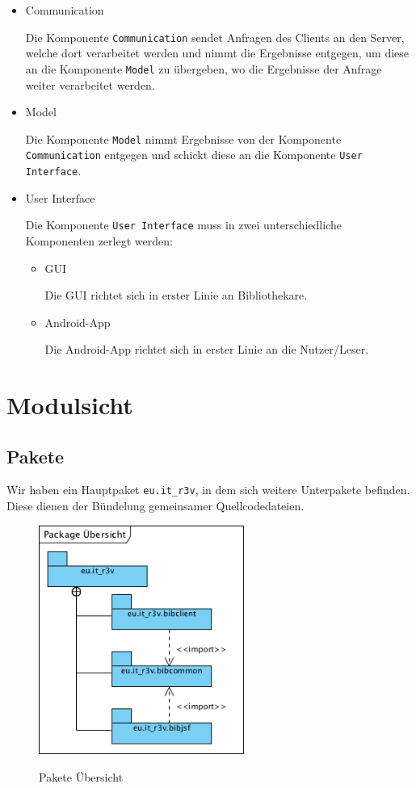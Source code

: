 \documentclass[fontsize=12pt,paper=a4,twoside]{scrartcl}
\begin{document}
\begin{itemize}
\item{Communication}

Die Komponente \texttt{Communication} sendet Anfragen des Clients an den Server, welche dort verarbeitet werden und nimmt die Ergebnisse entgegen, um diese an die Komponente \texttt{Model} zu übergeben, wo die Ergebnisse der Anfrage weiter verarbeitet werden.

\item{Model}

Die Komponente \texttt{Model} nimmt Ergebnisse von der Komponente \texttt{Communication} entgegen und schickt diese an die Komponente \texttt{User Interface}. 

\item{User Interface}

Die Komponente \texttt{User Interface} muss in zwei unterschiedliche Komponenten zerlegt werden:
\begin{itemize}
\item{GUI}

Die GUI richtet sich in erster Linie an Bibliothekare.
\item{Android-App}

Die Android-App richtet sich in erster Linie an die Nutzer/Leser.
\end{itemize}

\end{itemize}

\section{Modulsicht}
\label{sec:modulsicht}

\subsection{Pakete}
\label{sec:pakete}

Wir haben ein Hauptpaket \texttt{eu.it\_r3v}, in dem sich weitere Unterpakete befinden. Diese dienen der Bündelung gemeinsamer Quellcodedateien.

\begin{figure} [H] 
\caption{Pakete Übersicht} \centering
	\includegraphics[width=0.6\textwidth]{Diagramme/PackageUebersicht.png} 
	\label{pic:PackageUebersicht} 
\end{figure}
\label{sec:PackageUebersicht}
\end{document}

